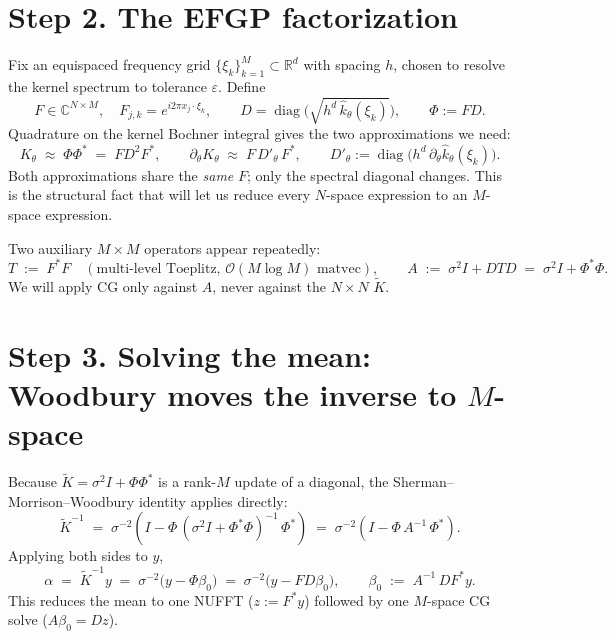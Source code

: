 \documentclass[11pt]{article}
\numberwithin{equation}{section}
\newcommand{\bigo}{\mathcal{O}}
\newcommand{\Ktil}{\widetilde K}
\newcommand{\Amean}{A}
\begin{document}
\section{Step 2. The EFGP factorization}

Fix an equispaced frequency grid $\{\xi_k\}_{k=1}^M\subset\mathbb{R}^d$ with
spacing $h$, chosen to resolve the kernel spectrum to tolerance $\varepsilon$.
Define
\begin{equation}
  F\in\mathbb{C}^{N\times M},\quad F_{j,k} = e^{i2\pi x_j\cdot\xi_k},\qquad
  D = \operatorname{diag}\!\bigl(\sqrt{h^d\,\hat k_\theta(\xi_k)}\bigr),\qquad
  \Phi := FD.
\end{equation}
Quadrature on the kernel Bochner integral gives the two approximations we need:
\begin{equation}
  K_\theta \;\approx\; \Phi\Phi^* \;=\; FD^2F^*,\qquad
  \partial_\theta K_\theta \;\approx\; F\,D'_\theta\,F^*,\qquad
  D'_\theta := \operatorname{diag}\!\bigl(h^d\,\partial_\theta\hat k_\theta(\xi_k)\bigr).
  \label{eq:efgp}
\end{equation}
Both approximations share the \emph{same} $F$; only the spectral diagonal
changes. This is the structural fact that will let us reduce every $N$-space
expression to an $M$-space expression.

Two auxiliary $M\times M$ operators appear repeatedly:
\begin{equation}
  T \;:=\; F^*F\quad(\text{multi-level Toeplitz, $\bigo(M\log M)$ matvec}),\qquad
  \Amean \;:=\; \sigma^2 I + DTD \;=\; \sigma^2 I + \Phi^*\Phi.
  \label{eq:AT}
\end{equation}
We will apply CG only against $\Amean$, never against the $N\times N$ $\Ktil$.

\section{Step 3. Solving the mean: Woodbury moves the inverse to $M$-space}

Because $\Ktil = \sigma^2 I + \Phi\Phi^*$ is a rank-$M$ update of a diagonal, the
Sherman--Morrison--Woodbury identity applies directly:
\begin{equation}
  \Ktil^{-1}
  \;=\; \sigma^{-2}\!\left(I - \Phi\,(\sigma^2 I + \Phi^*\Phi)^{-1}\,\Phi^*\right)
  \;=\; \sigma^{-2}\!\left(I - \Phi\,\Amean^{-1}\,\Phi^*\right).
  \label{eq:woodbury}
\end{equation}
Applying both sides to $y$,
\begin{equation}
  \alpha \;=\; \Ktil^{-1}y \;=\; \sigma^{-2}\bigl(y - \Phi\beta_0\bigr)
                       \;=\; \sigma^{-2}\bigl(y - FD\beta_0\bigr),\qquad
  \beta_0 \;:=\; \Amean^{-1}\,DF^*y.
  \label{eq:alpha_beta0}
\end{equation}
This reduces the mean to one NUFFT ($z := F^*y$) followed by one $M$-space CG
solve ($\Amean\beta_0 = Dz$).
\end{document}
